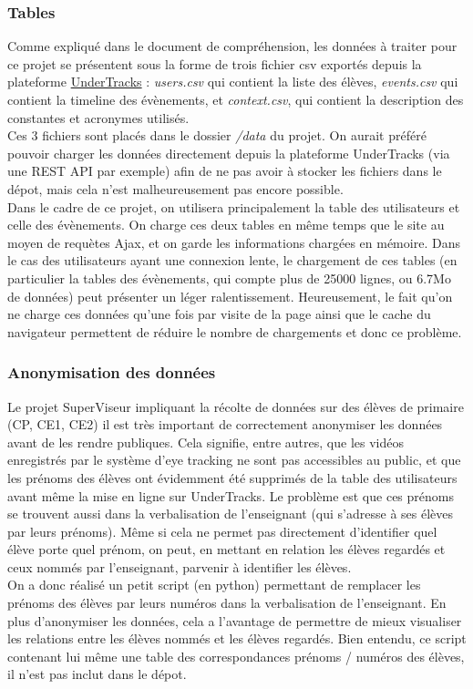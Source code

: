 \documentclass{article}
\begin{document}
\subsubsection{Tables}
Comme expliqué dans le document de compréhension, les données à traiter pour ce projet se présentent sous la forme de trois fichier csv exportés depuis la plateforme \href{https://undertracks.imag.fr/}{UnderTracks} : \textit{users.csv} qui contient la liste des élèves, \textit{events.csv} qui contient la timeline des évènements, et \textit{context.csv}, qui contient la description des constantes et acronymes utilisés.\\
Ces 3 fichiers sont placés dans le dossier \textit{/data} du projet. On aurait préféré pouvoir charger les données directement depuis la plateforme UnderTracks (via une REST API par exemple) afin de ne pas avoir à stocker les fichiers dans le dépot, mais cela n'est malheureusement pas encore possible.\\
Dans le cadre de ce projet, on utilisera principalement la table des utilisateurs et celle des évènements. On charge ces deux tables en même temps que le site au moyen de requètes Ajax, et on garde les informations chargées en mémoire. Dans le cas des utilisateurs ayant une connexion lente, le chargement de ces tables (en particulier la tables des évènements, qui compte plus de 25000 lignes, ou 6.7Mo de données) peut présenter un léger ralentissement. Heureusement, le fait qu'on ne charge ces données qu'une fois par visite de la page ainsi que le cache du navigateur permettent de réduire le nombre de chargements et donc ce problème.

\subsubsection{Anonymisation des données}
Le projet SuperViseur impliquant la récolte de données sur des élèves de primaire (CP, CE1, CE2) il est très important de correctement anonymiser les données avant de les rendre publiques. Cela signifie, entre autres, que les vidéos enregistrés par le système d'eye tracking ne sont pas accessibles au public, et que les prénoms des élèves ont évidemment été supprimés de la table des utilisateurs avant même la mise en ligne sur UnderTracks. Le problème est que ces prénoms se trouvent aussi dans la verbalisation de l'enseignant (qui s'adresse à ses élèves par leurs prénoms). Même si cela ne permet pas directement d'identifier quel élève porte quel prénom, on peut, en mettant en relation les élèves regardés et ceux nommés par l'enseignant, parvenir à identifier les élèves.\\
On a donc réalisé un petit script (en python) permettant de remplacer les prénoms des élèves par leurs numéros dans la verbalisation de l'enseignant. En plus d'anonymiser les données, cela a l'avantage de permettre de mieux visualiser les relations entre les élèves nommés et les élèves regardés. Bien entendu, ce script contenant lui même une table des correspondances prénoms / numéros des élèves, il n'est pas inclut dans le dépot.
\end{document}
